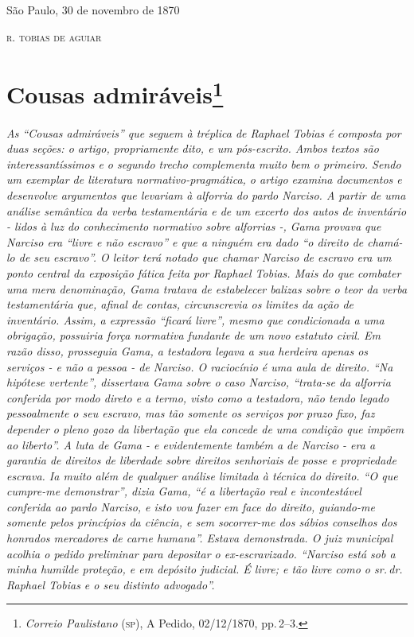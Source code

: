 \begin{flushright}
São Paulo, 30 de novembro de 1870

\textsc{r. tobias de aguiar}
\end{flushright}

\chapter{Cousas admiráveis\footnote{\emph{Correio Paulistano} (\textsc{sp}), A Pedido, 02/12/1870,
  pp.\,2--3.}} %

\begin{didascalia}
\emph{As ``Cousas admiráveis'' que seguem à tréplica de Raphael Tobias é
composta por duas seções: o artigo, propriamente dito, e um pós-escrito.
Ambos textos são interessantíssimos e o segundo trecho complementa muito
bem o primeiro. Sendo um exemplar de literatura normativo-pragmática, o
artigo examina documentos e desenvolve argumentos que levariam à
alforria do pardo Narciso. A partir de uma análise semântica da verba
testamentária e de um excerto dos autos de inventário - lidos à luz do
conhecimento normativo sobre alforrias -, Gama provava que Narciso era
``livre e não escravo'' e que a ninguém era dado ``o direito de chamá-lo de
seu escravo''. O leitor terá notado que chamar Narciso de escravo era um
ponto central da exposição fática feita por Raphael Tobias. Mais do que
combater uma mera denominação, Gama tratava de estabelecer balizas sobre
o teor da verba testamentária que, afinal de contas, circunscrevia os
limites da ação de inventário. Assim, a expressão ``ficará livre'', mesmo
que condicionada a uma obrigação, possuiria força normativa fundante de
um novo estatuto civil. Em razão disso, prosseguia Gama, a testadora
legava a sua herdeira apenas os serviços - e não a pessoa - de Narciso.
O raciocínio é uma aula de direito. ``Na hipótese vertente'', dissertava
Gama sobre o caso Narciso, ``trata-se da alforria conferida por modo
direto e a termo, visto como a testadora, não tendo legado pessoalmente
o seu escravo, mas tão somente os serviços por prazo fixo, faz depender
o pleno gozo da libertação que ela concede de uma condição que impõem ao
liberto''. A luta de Gama - e evidentemente também a de Narciso - era a
garantia de direitos de liberdade sobre direitos senhoriais de posse e
propriedade escrava. Ia muito além de qualquer análise limitada à
técnica do direito. ``O que cumpre-me demonstrar'', dizia Gama, ``é a
libertação real e incontestável conferida ao pardo Narciso, e isto vou
fazer em face do direito, guiando-me somente pelos princípios da
ciência, e sem socorrer-me dos sábios conselhos dos honrados mercadores
de carne humana''. Estava demonstrada. O juiz municipal acolhia o pedido
preliminar para depositar o ex-escravizado. ``Narciso está sob a minha
humilde proteção, e em depósito judicial. É livre; e tão livre como o
sr.\,dr.\,Raphael Tobias e o seu distinto advogado''.}
\end{didascalia}

